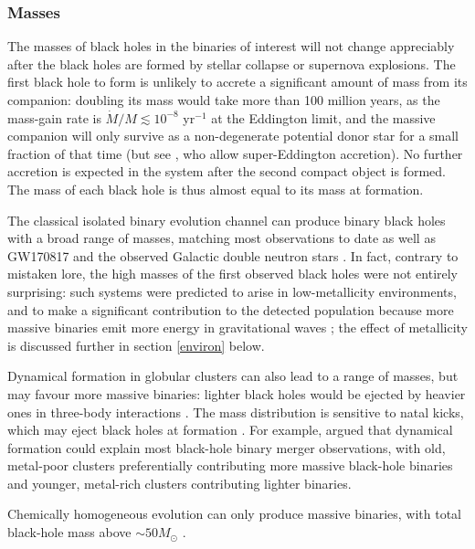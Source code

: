 \documentclass[review]{elsarticle}
\begin{document}
\subsubsection{Masses}
The masses of black holes in the binaries of interest will not change appreciably after the black holes are formed by stellar collapse or supernova explosions.  The first black hole to form is unlikely to accrete a significant amount of mass from its companion: doubling its mass would take more than 100 million years, as the mass-gain rate is $\dot{M}/M \lesssim 10^{-8}$ yr$^{-1}$ at the Eddington limit, and the massive companion will only survive as a non-degenerate potential donor star for a small fraction of that time (but see \cite{Eldridge:2017,Bavera:2020,vanSon:2020}, who allow super-Eddington accretion). No further accretion is expected in the system after the second compact object is formed. The mass of each black hole is thus almost equal to its mass at formation. 

The classical isolated binary evolution channel can produce binary black holes with a broad range of masses, matching most observations to date \citep[e.g.,][]{Stevenson:2017,Eldridge:2017,GiacobboMapelli:2018} as well as GW170817 and the observed Galactic double neutron stars \citep[e.g.,][]{Kruckow:2018,VignaGomez:2018}.  In fact, contrary to mistaken lore, the high masses of the first observed black holes were not entirely surprising: such systems were predicted to arise in low-metallicity environments, and to make a significant contribution to the detected population because more massive binaries emit more energy in gravitational waves \citep{Dominik:2014}; the effect of metallicity is discussed further in section \ref{environ} below. 

Dynamical formation in globular clusters can also lead to a range of masses, but may favour more massive binaries: lighter black holes would be ejected by heavier ones in three-body interactions \citep{Rodriguez:2015}. The mass distribution is sensitive to natal kicks, which may eject black holes at formation \citep{Zevin:2017}.  For example, \citet{Chatterjee:2017} argued that dynamical formation could explain most black-hole binary merger observations, with old, metal-poor clusters preferentially contributing more massive black-hole binaries and younger, metal-rich clusters contributing lighter binaries.
 
Chemically homogeneous evolution can only produce massive binaries, with total black-hole mass above $\sim 50 M_\odot$ \citep{MandeldeMink:2016,Marchant:2016}.
\end{document}
